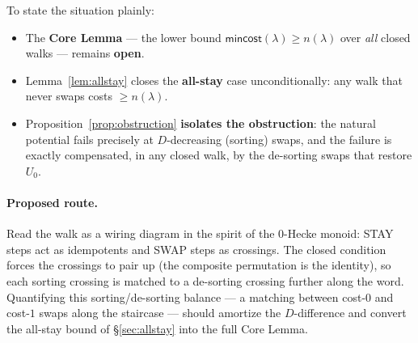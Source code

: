 \documentclass[11pt]{article}
\theoremstyle{plain}
\theoremstyle{remark}
\newcommand{\mincost}{\mathsf{mincost}}
\begin{document}
To state the situation plainly:
\begin{itemize}
  \item The \textbf{Core Lemma} --- the lower bound
        $\mincost(\lambda)\ge n(\lambda)$ over \emph{all} closed walks ---
        remains \textbf{open}.
  \item Lemma~\ref{lem:allstay} closes the \textbf{all-stay} case
        unconditionally: any walk that never swaps costs $\ge n(\lambda)$.
  \item Proposition~\ref{prop:obstruction} \textbf{isolates the obstruction}:
        the natural potential fails precisely at $D$-decreasing (sorting)
        swaps, and the failure is exactly compensated, in any closed walk,
        by the de-sorting swaps that restore $U_0$.
\end{itemize}

\paragraph{Proposed route.}
Read the walk as a wiring diagram in the spirit of the $0$-Hecke monoid:
STAY steps act as idempotents and SWAP steps as crossings. The closed
condition forces the crossings to pair up (the composite permutation is the
identity), so each sorting crossing is matched to a de-sorting crossing
further along the word. Quantifying this sorting/de-sorting balance --- a
matching between cost-$0$ and cost-$1$ swaps along the staircase --- should
amortize the $D$-difference and convert the all-stay bound of
\S\ref{sec:allstay} into the full Core Lemma.
\end{document}
